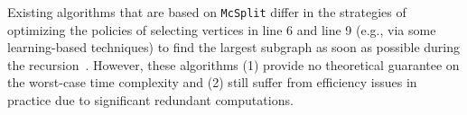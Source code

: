 
{\cheng Existing algorithms that are based on \texttt{McSplit} differ in the strategies of optimizing} the policies of selecting vertices in  line 6 and line 9 (e.g., via some learning-based techniques) to find the largest    subgraph as soon as possible during the recursion~\cite{zhoustrengthened,liu2020learning,liu2023hybrid}. 
%
{\Yui However, these algorithms (1) provide no theoretical guarantee on the worst-case time complexity and (2) still suffer from efficiency issues in practice due to  significant redundant computations.}
%
%


